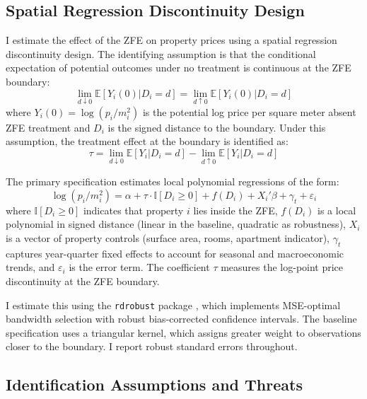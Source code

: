 \documentclass[12pt]{article}
\newcommand{\E}{\mathbb{E}}
\newcommand{\ind}{\mathbb{I}}
\begin{document}
\subsection{Spatial Regression Discontinuity Design}

I estimate the effect of the ZFE on property prices using a spatial regression discontinuity design. The identifying assumption is that the conditional expectation of potential outcomes under no treatment is continuous at the ZFE boundary:
\begin{equation}
    \lim_{d \downarrow 0} \E[Y_i(0) | D_i = d] = \lim_{d \uparrow 0} \E[Y_i(0) | D_i = d]
    \label{eq:continuity}
\end{equation}
where $Y_i(0) = \log(p_i / m^2_i)$ is the potential log price per square meter absent ZFE treatment and $D_i$ is the signed distance to the boundary. Under this assumption, the treatment effect at the boundary is identified as:
\begin{equation}
    \tau = \lim_{d \downarrow 0} \E[Y_i | D_i = d] - \lim_{d \uparrow 0} \E[Y_i | D_i = d]
    \label{eq:rdd}
\end{equation}

The primary specification estimates local polynomial regressions of the form:
\begin{equation}
    \log(p_i / m^2_i) = \alpha + \tau \cdot \ind[D_i \geq 0] + f(D_i) + X_i'\beta + \gamma_t + \varepsilon_i
    \label{eq:main}
\end{equation}
where $\ind[D_i \geq 0]$ indicates that property $i$ lies inside the ZFE, $f(D_i)$ is a local polynomial in signed distance (linear in the baseline, quadratic as robustness), $X_i$ is a vector of property controls (surface area, rooms, apartment indicator), $\gamma_t$ captures year-quarter fixed effects to account for seasonal and macroeconomic trends, and $\varepsilon_i$ is the error term. The coefficient $\tau$ measures the log-point price discontinuity at the ZFE boundary.

I estimate this using the \texttt{rdrobust} package \citep{calonico2014robust, calonico2020rdrobust}, which implements MSE-optimal bandwidth selection with robust bias-corrected confidence intervals. The baseline specification uses a triangular kernel, which assigns greater weight to observations closer to the boundary. I report robust standard errors throughout.

\subsection{Identification Assumptions and Threats}
\end{document}
